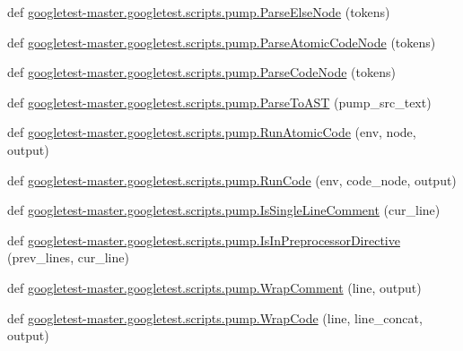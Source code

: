 \begin{DoxyCompactItemize}
\item 
def \mbox{\hyperlink{namespacegoogletest-master_1_1googletest_1_1scripts_1_1pump_a301975d984ef0c7a3e64acc10c9aed2a}{googletest-\/master.\+googletest.\+scripts.\+pump.\+Parse\+Else\+Node}} (tokens)
\item 
def \mbox{\hyperlink{namespacegoogletest-master_1_1googletest_1_1scripts_1_1pump_abeaaeb0495fd0f5039921b57835147a7}{googletest-\/master.\+googletest.\+scripts.\+pump.\+Parse\+Atomic\+Code\+Node}} (tokens)
\item 
def \mbox{\hyperlink{namespacegoogletest-master_1_1googletest_1_1scripts_1_1pump_a6f1964221bb2379348d7fa1a61e00696}{googletest-\/master.\+googletest.\+scripts.\+pump.\+Parse\+Code\+Node}} (tokens)
\item 
def \mbox{\hyperlink{namespacegoogletest-master_1_1googletest_1_1scripts_1_1pump_a41cfeb42e479045ccae88f1253dc7f09}{googletest-\/master.\+googletest.\+scripts.\+pump.\+Parse\+To\+A\+ST}} (pump\+\_\+src\+\_\+text)
\item 
def \mbox{\hyperlink{namespacegoogletest-master_1_1googletest_1_1scripts_1_1pump_a067e8b85966c613af721fc46584fb1e7}{googletest-\/master.\+googletest.\+scripts.\+pump.\+Run\+Atomic\+Code}} (env, node, output)
\item 
def \mbox{\hyperlink{namespacegoogletest-master_1_1googletest_1_1scripts_1_1pump_acbfecb79890de0da1f326208394ada4e}{googletest-\/master.\+googletest.\+scripts.\+pump.\+Run\+Code}} (env, code\+\_\+node, output)
\item 
def \mbox{\hyperlink{namespacegoogletest-master_1_1googletest_1_1scripts_1_1pump_a6d0eaea654bec53453ed06d2ff230bae}{googletest-\/master.\+googletest.\+scripts.\+pump.\+Is\+Single\+Line\+Comment}} (cur\+\_\+line)
\item 
def \mbox{\hyperlink{namespacegoogletest-master_1_1googletest_1_1scripts_1_1pump_ab5f2255303d60f6b7b5b4d2512c588be}{googletest-\/master.\+googletest.\+scripts.\+pump.\+Is\+In\+Preprocessor\+Directive}} (prev\+\_\+lines, cur\+\_\+line)
\item 
def \mbox{\hyperlink{namespacegoogletest-master_1_1googletest_1_1scripts_1_1pump_a4b20aced378c37e54acb7d5aff578c4d}{googletest-\/master.\+googletest.\+scripts.\+pump.\+Wrap\+Comment}} (line, output)
\item 
def \mbox{\hyperlink{namespacegoogletest-master_1_1googletest_1_1scripts_1_1pump_a7f71749d88261af88a8458ef0d4644d5}{googletest-\/master.\+googletest.\+scripts.\+pump.\+Wrap\+Code}} (line, line\+\_\+concat, output)
\item 

\end{DoxyCompactItemize}
